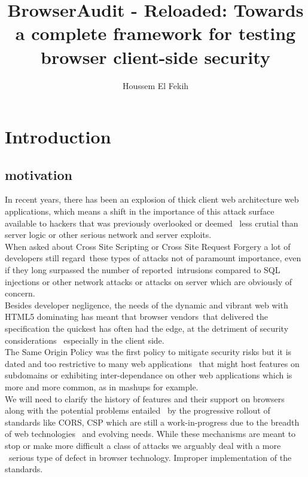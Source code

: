 \documentclass[a4paper,12pt]{paper}
\title{BrowserAudit - Reloaded: Towards a complete framework for testing browser client-side security}
\author{Houssem El Fekih}
\begin{document}
\maketitle 
\begin{abstract}
 
\end{abstract}


\tableofcontents
\pagebreak

\listoffigures
\listoftables
{}

\section{Introduction}

\subsection{motivation}
In recent years, there has been an explosion of thick client web architecture web applications,
which means a shift in the importance of this attack surface available to hackers that was previously overlooked or deemed \
less crutial than server logic or other serious network and server exploits.\\

When asked about Cross Site Scripting or Cross Site Request Forgery a lot of developers still regard\
these types of attacks not of paramount importance, even if they long surpassed the number of reported\
intrusions compared to SQL injections or other network attacks or attacks on server which are obviously of concern.\\

Besides developer negligence, the needs of the dynamic and vibrant web with HTML5 dominating has meant that browser vendors\
that delivered the specification the quickest has often had the edge, at the detriment of security considerations \
especially in the client side.\\

The Same Origin Policy was the first policy to mitigate security risks but it is dated and too restrictive to many web applications \
that might host features on subdomains or exhibiting inter-dependance on other web applications which is more and more common, as in mashups \cite{mashup} for example.\\

We will need to clarify the history of features and their support on browsers along with the potential problems entailed \
by the progressive rollout of standards like CORS, CSP which are still a work-in-progress due to the breadth of web technologies \
and evolving needs. While these mechanisms are meant to stop or make more difficult a class of attacks we arguably deal with a more \
serious type of defect in browser technology. Improper implementation of the standards.\\
\end{document}
